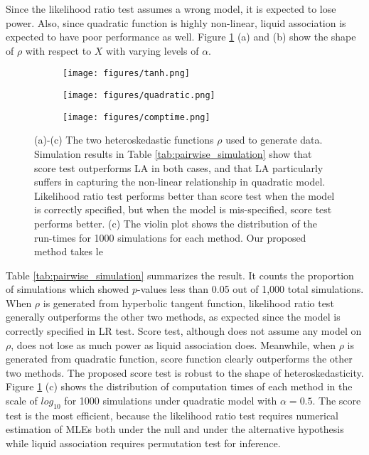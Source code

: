 \documentclass[aap, preprint]{imsart}
\numberwithin{equation}{section}
\theoremstyle{plain}
\begin{document}
Since the likelihood ratio test assumes a wrong model, it is expected to lose power. Also, since quadratic function is highly non-linear, liquid association is expected to have poor performance as well. Figure \ref{fig:sim} (a) and (b) show the shape of $\rho$ with respect to $X$ with varying levels of $\alpha$. \\
\begin{figure}
     \begin{subfigure}[b]{0.3\textwidth}
         \texttt{[image: figures/tanh.png]}
         \caption{}
     \end{subfigure}
     \begin{subfigure}[b]{0.3\textwidth}
         \texttt{[image: figures/quadratic.png]}
         \caption{}
     \end{subfigure}
     \begin{subfigure}[b]{0.3\textwidth}
         \texttt{[image: figures/comptime.png]}
         \caption{}
     \end{subfigure}
        \caption{\label{fig:sim} (a)-(c) The two heteroskedastic functions $\rho$ used to generate data. Simulation results in Table \ref{tab:pairwise_simulation} show that score test outperforms LA in both cases, and that LA particularly suffers in capturing the non-linear relationship in quadratic model. Likelihood ratio test performs better than score test when the model is correctly specified, but when the model is mis-specified, score test performs better. (c) The violin plot shows the distribution of the run-times for 1000 simulations for each method. Our proposed method takes le}
\end{figure}

Table \ref{tab:pairwise_simulation} summarizes the result. It counts the proportion of simulations which showed $p$-values less than 0.05 out of 1,000 total simulations. When $\rho$ is generated from hyperbolic tangent function, likelihood ratio test generally outperforms the other two methods, as expected since the model is correctly specified in LR test. Score test, although does not assume any model on $\rho$, does not lose as much power as liquid association does. Meanwhile, when $\rho$ is generated from quadratic function, score function clearly outperforms the other two methods. The proposed score test is robust to the shape of heteroskedasticity. Figure \ref{fig:sim} (c) shows the distribution of computation times of each method in the scale of $log_{10}$ for 1000 simulations under quadratic model with $\alpha = 0.5$. The score test is the most efficient, because the likelihood ratio test requires numerical estimation of MLEs both under the null and under the alternative hypothesis while liquid association requires permutation test for inference. 
\end{document}
